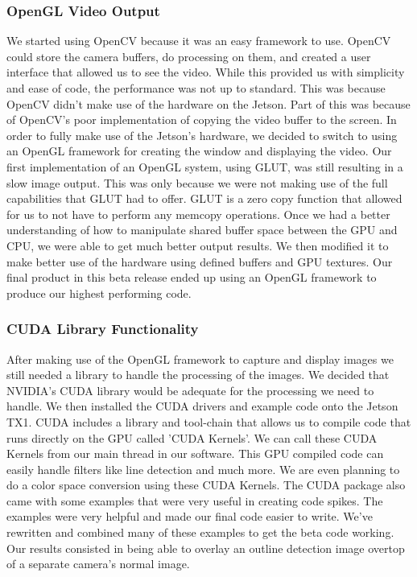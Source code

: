 \documentclass[letterpaper,10pt,titlepage]{IEEEtran}
\begin{document}
   \subsubsection{OpenGL Video Output}
	We started using OpenCV because it was an easy framework to use. OpenCV could store the camera buffers, do processing on them, and created a user interface that allowed us to see the video. While this provided us with simplicity and ease of code, the performance was not up to standard. This was because OpenCV didn't make use of the hardware on the Jetson. Part of this was because of OpenCV's poor implementation of copying the video buffer to the screen. In order to fully make use of the Jetson's hardware, we decided to switch to using an OpenGL framework for creating the window and displaying the video. Our first implementation of an OpenGL system, using GLUT, was still resulting in a slow image output. This was only because we were not making use of the full capabilities that GLUT had to offer. GLUT is a zero copy function that allowed for us to not have to perform any memcopy operations. Once we had a better understanding of how to manipulate shared buffer space between the GPU and CPU, we were able to get much better output results. We then modified it to make better use of the hardware using defined buffers and GPU textures. Our final product in this beta release ended up using an OpenGL framework to produce our highest performing code.\\

  \subsubsection{CUDA Library Functionality}
   After making use of the OpenGL framework to capture and display images we still needed a library to handle the processing of the images. We decided that NVIDIA's CUDA library would be adequate for the processing we need to handle. We then installed the CUDA drivers and example code onto the Jetson TX1. CUDA includes a library and tool-chain that allows us to compile code that runs directly on the GPU called 'CUDA Kernels'. We can call these CUDA Kernels from our main thread in our software. This GPU compiled code can easily handle filters like line detection and much more. We are even planning to do a color space conversion using these CUDA Kernels. The CUDA package also came with some examples that were very useful in creating code spikes. The examples were very helpful and made our final code easier to write. We've rewritten and combined many of these examples to get the beta code working. Our results consisted in being able to overlay an outline detection image overtop of a separate camera's normal image.\\
\end{document}
